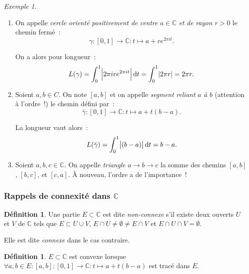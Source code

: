 \documentclass{report}
\theoremstyle{definition}
\newtheorem{déf}[thm]{Définition}
\theoremstyle{remark}
\newtheorem{ex}{Exemple}[chapter]
\numberwithin{equation}{section}
\newcommand{\C}{\mathbb C}
\begin{document}
			\begin{ex}~
			\begin{enumerate}
				\item On appelle \textit{cercle orienté positivement de centre $a \in \C$ et de rayon $r > 0$} le chemin fermé~:
				\begin{equation}
					\gamma : [0, 1] \to \C : t \mapsto a + re^{2\pi it}.
				\end{equation}

				On a alors pour longueur~:
				\begin{equation}
					L(\gamma) = \int_0^1 \abs {2\pi i re^{2\pi it}}\dif t = \int_0^1\abs {2\pi r} = 2\pi r.
				\end{equation}

				\item Soient $a, b \in C$. On note $[a, b]$ et on appelle \textit{segment reliant $a$ à $b$} (attention à l'ordre~!) le chemin défini par~:
				\begin{equation}
					\bar \gamma : [0, 1] \to \C : t \mapsto a + t(b-a).
				\end{equation}

				La longueur vaut alors~:
				\begin{equation}
					L(\bar \gamma) = \int_0^1\abs {(b-a)}\dif t = b-a.
				\end{equation}

				\item Soient $a, b, c \in \C$. On appelle \textit{triangle $a \to b \to c$} la somme des chemins $[a, b]$, $[b, c]$, et $[c, a]$.
				À nouveau, l'ordre a de l'importance~!
			\end{enumerate}
			\end{ex}

		\subsubsection{Rappels de connexité dans $\C$}
			\begin{déf} Une partie $E \subset \C$ est dite \textit{non-connexe} s'il existe deux ouverts $U$ et $V$ de $\C$ tels que $E \subset U \cup V$,
			$E \cap U \neq \emptyset \neq E \cap V$ et $E \cap U \cap V = \emptyset$.

			Elle est dite \textit{connexe} dans le cas contraire.
			\end{déf}

			\begin{déf} $E \subset \C$ est convexe lorsque $\forall a, b \in E : [a, b] : [0, 1] \to \C : t \mapsto a + t(b-a)$ est tracé dans $E$.
			\end{déf}
\end{document}
